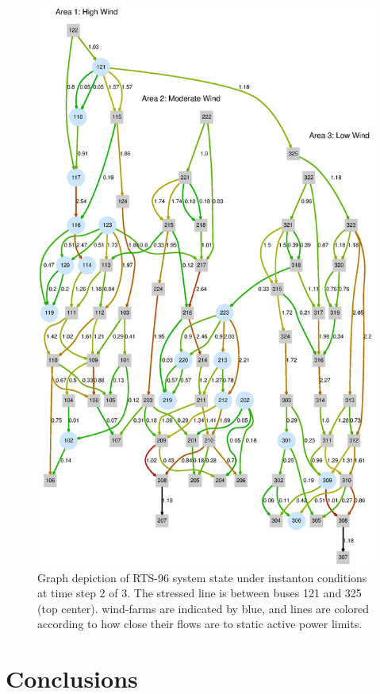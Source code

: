 \documentclass[conference]{IEEEtran}
\begin{document}
\begin{figure}[t]
\centering
\includegraphics[width=1\linewidth]{images/line118}
\caption{Graph depiction of RTS-96 system state under instanton conditions at time step 2 of 3. The stressed line is between buses 121 and 325 (top center). wind-farms are indicated by blue, and lines are colored according to how close their flows are to static active power limits.}
\label{fig:line118}
\end{figure}


\section{Conclusions}
\end{document}
